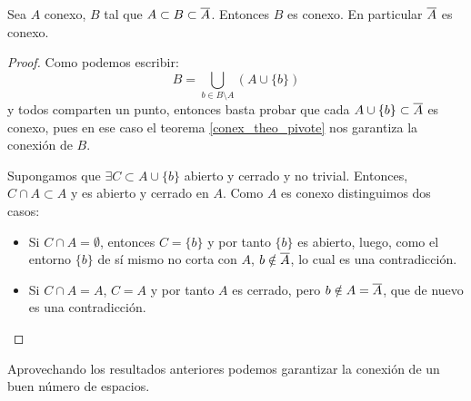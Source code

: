 \begin{theo}
	Sea $A$ conexo, $B$ tal que $A\subset B\subset\overline{A}$. Entonces $B$ es conexo. En particular $\overline{A}$ es conexo.
	
	\begin{proof}
		Como podemos escribir:
		\[B=\bigcup_{b\in B\setminus A} (A\cup\{b\}) \]
		y todos comparten un punto, entonces basta probar que cada $A\cup\{b\}\subset\overline{A}$ es conexo, pues en ese caso el teorema \ref{conex_theo_pivote} nos garantiza la conexión de $B$.
		
		Supongamos que $\exists C\subset A\cup\{b\}$ abierto y cerrado y no trivial. Entonces, $C\cap A\subset A$ y es abierto y cerrado en $A$. Como $A$ es conexo distinguimos dos casos:
		
		\begin{itemize}
			\item Si $C\cap A=\emptyset$, entonces $C=\{b\}$ y por tanto $\{b\}$ es abierto, luego, como el entorno $\{b\}$ de sí mismo no corta con $A$, $b\notin\overline{A}$, lo cual es una contradicción.
			\item Si $C\cap A=A$, $C=A$ y por tanto $A$ es cerrado, pero $b\notin A=\overline{A}$, que de nuevo es una contradicción. \qedhere
		\end{itemize}
	\end{proof}
\end{theo}

Aprovechando los resultados anteriores podemos garantizar la conexión de un buen número de espacios.

